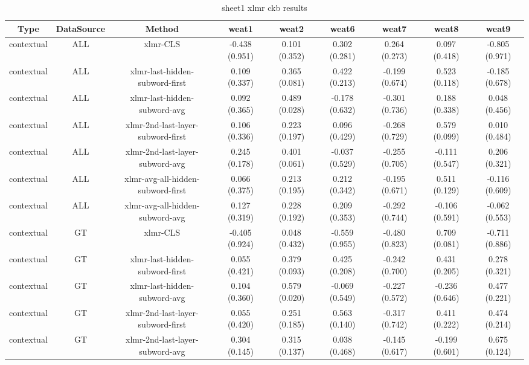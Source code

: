 \begin{sidewaystable}[htb]
    \centering
    \caption{sheet1 xlmr ckb results}
    \label{appendix_tab:sheet1_xlmr_ckb_results}
    \small
    \begin{tabular}{@{}ccccccccc@{}}
        \toprule
        Type & DataSource & Method & weat1 & weat2 & weat6 & weat7 & weat8 & weat9 \\
        \midrule
        contextual & ALL & xlmr-CLS & -0.438 (0.951) & 0.101 (0.352) & 0.302 (0.281) & 0.264 (0.273) & 0.097 (0.418) & -0.805 (0.971) \\
        contextual & ALL & xlmr-last-hidden-subword-first & 0.109 (0.337) & 0.365 (0.081) & 0.422 (0.213) & -0.199 (0.674) & 0.523 (0.118) & -0.185 (0.678) \\
        contextual & ALL & xlmr-last-hidden-subword-avg & 0.092 (0.365) & 0.489 (0.028) & -0.178 (0.632) & -0.301 (0.736) & 0.188 (0.338) & 0.048 (0.456) \\
        contextual & ALL & xlmr-2nd-last-layer-subword-first & 0.106 (0.336) & 0.223 (0.197) & 0.096 (0.429) & -0.268 (0.729) & 0.579 (0.099) & 0.010 (0.484) \\
        contextual & ALL & xlmr-2nd-last-layer-subword-avg & 0.245 (0.178) & 0.401 (0.061) & -0.037 (0.529) & -0.255 (0.705) & -0.111 (0.547) & 0.206 (0.321) \\
        contextual & ALL & xlmr-avg-all-hidden-subword-first & 0.066 (0.375) & 0.213 (0.195) & 0.212 (0.342) & -0.195 (0.671) & 0.511 (0.129) & -0.116 (0.609) \\
        contextual & ALL & xlmr-avg-all-hidden-subword-avg & 0.127 (0.319) & 0.228 (0.192) & 0.209 (0.353) & -0.292 (0.744) & -0.106 (0.591) & -0.062 (0.553) \\
        contextual & GT & xlmr-CLS & -0.405 (0.924) & 0.048 (0.432) & -0.559 (0.955) & -0.480 (0.823) & 0.709 (0.081) & -0.711 (0.886) \\
        contextual & GT & xlmr-last-hidden-subword-first & 0.055 (0.421) & 0.379 (0.093) & 0.425 (0.208) & -0.242 (0.700) & 0.431 (0.205) & 0.278 (0.321) \\
        contextual & GT & xlmr-last-hidden-subword-avg & 0.104 (0.360) & 0.579 (0.020) & -0.069 (0.549) & -0.227 (0.572) & -0.236 (0.646) & 0.477 (0.221) \\
        contextual & GT & xlmr-2nd-last-layer-subword-first & 0.055 (0.420) & 0.251 (0.185) & 0.563 (0.140) & -0.317 (0.742) & 0.411 (0.222) & 0.474 (0.214) \\
        contextual & GT & xlmr-2nd-last-layer-subword-avg & 0.304 (0.145) & 0.315 (0.137) & 0.038 (0.468) & -0.145 (0.617) & -0.199 (0.601) & 0.675 (0.124) \\

\end{tabular}
\end{sidewaystable}
